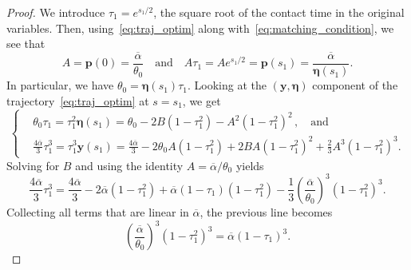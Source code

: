 \documentclass[10pt]{amsart}
\theoremstyle{definition}\newtheorem{defi}[theo]{Definition}\newtheorem{rema}[theo]{Remark}\newtheorem{exam}[theo]{Example}\newtheorem{exem}[theo]{Example}\newtheorem{nota}[theo]{Notation}
\newcommand{\bp}{\mathbf{p}}
\newcommand{\by}{\mathbf{y}}
\newcommand{\beeta}{\boldsymbol{\eta}}
\newcommand{\1}{\mathds{1}}
\begin{document}
\begin{proof}
We introduce $\tau_1 = e^{s_1/2}$, the square root of the contact time in the original variables. Then, using~\eqref{eq:traj_optim} along with~\eqref{eq:matching_condition}, we see that
\begin{equation}\label{eq:A}
A = \bp(0) = \frac{\overline\alpha}{\theta_0}
\quad \text{and} \quad A\tau_1 = A e^{s_1/2} = \bp(s_1) = \frac{\overline\alpha}{\beeta(s_1)}.
\end{equation}
In particular, we have $\theta_0 = \beeta(s_1)\tau_1$. Looking at the $(\by,\beeta)$ component of the trajectory~\eqref{eq:traj_optim} at $s=s_1$, we get
\[
\begin{cases}
&\displaystyle \theta_0 \tau_1 = \tau_1^2 \beeta(s_1) = \theta_0 - 2 B\left(1-\tau_1^2\right) - A^2 \left(1-\tau_1^2\right)^2\,,
\quad \text{and}\quad
\\[0.10em]
&\displaystyle \frac{4\overline\alpha}{3}\tau_1^{3} = \tau_1^{3}\by(s_1) = \frac{4\overline\alpha}{3} - 2\theta_0 A \left(1 - \tau_1^2\right) + 2BA \left(1-\tau_1^2\right)^2 + \frac{2}{3} A^3 \left(1-\tau_1^2\right)^3.
\end{cases}
\]
Solving for $B$ and using the identity $A = \overline \alpha / \theta_0$ yields
\[
\frac{4\overline \alpha}{3} \tau_1^3 = \frac{4\overline\alpha}{3} - 2 \overline\alpha \left(1- \tau_1^2\right) + \overline\alpha (1 - \tau_1)\left(1 - \tau_1^2\right) - \frac{1}{3}\left(\frac{\overline\alpha}{\theta_0}\right)^3 \left(1-\tau_1^2\right)^3.
\]
Collecting all terms that are linear in $\overline \alpha$, the previous line becomes
\begin{equation}\label{eq:cubic}
\left(\frac{\overline\alpha}{\theta_0}\right)^3 \left(1-\tau_1^2\right)^3 = \overline \alpha \left(1- \tau_1\right)^3.
\end{equation}




\end{proof}
\end{document}
